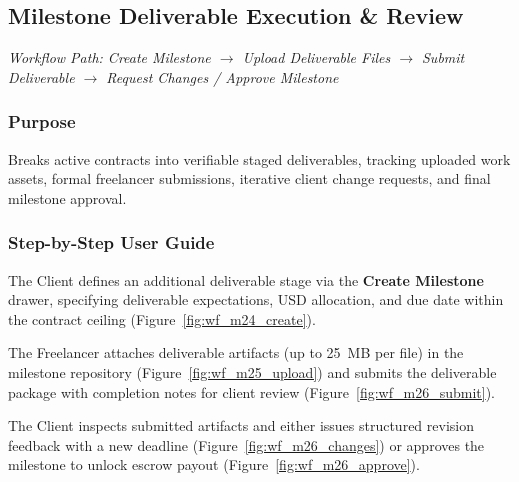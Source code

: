 
\subsection{Milestone Deliverable Execution \& Review}
\noindent\textit{Workflow Path: Create Milestone $\rightarrow$ Upload Deliverable Files $\rightarrow$ Submit Deliverable $\rightarrow$ Request Changes / Approve Milestone}

\subsubsection{Purpose}
Breaks active contracts into verifiable staged deliverables, tracking uploaded work assets, formal freelancer submissions, iterative client change requests, and final milestone approval.

\subsubsection{Step-by-Step User Guide}

The Client defines an additional deliverable stage via the \textbf{Create Milestone} drawer, specifying deliverable expectations, USD allocation, and due date within the contract ceiling (Figure~\ref{fig:wf_m24_create}).


The Freelancer attaches deliverable artifacts (up to 25~MB per file) in the milestone repository (Figure~\ref{fig:wf_m25_upload}) and submits the deliverable package with completion notes for client review (Figure~\ref{fig:wf_m26_submit}).



The Client inspects submitted artifacts and either issues structured revision feedback with a new deadline (Figure~\ref{fig:wf_m26_changes}) or approves the milestone to unlock escrow payout (Figure~\ref{fig:wf_m26_approve}).


